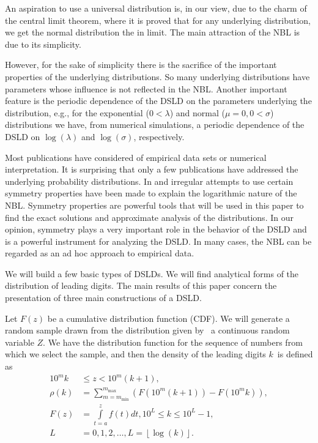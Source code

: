 \documentclass[titlepage,fleqn]{article}%
\begin{document}
An aspiration to use a universal distribution is, in our view, due to the
charm of the central limit theorem, where it is proved that for any underlying
distribution, we get the normal distribution the in limit. The main attraction
of the NBL is due to its simplicity.

However, for the sake of simplicity there is the sacrifice of the important
properties of the underlying distributions. So many underlying distributions
have parameters whose influence is not reflected in the NBL. Another important
feature is the periodic dependence of the DSLD on the parameters underlying
the distribution, e.g., for the exponential ($0<\lambda$) and normal
($\mu=0,0<\sigma$) distributions we have, from numerical simulations, a
periodic dependence of the DSLD on $\log(\lambda)$ and $\log(\sigma)$, respectively.

Most publications have considered of empirical data sets or numerical
interpretation. It is surprising that only a few publications have addressed
the underlying probability distributions. In
\cite{pinkham} and \cite{raimi}
irregular attempts to use certain symmetry properties have been made to
explain the logarithmic nature of the NBL. Symmetry properties are powerful
tools that will be used in this paper to find the exact solutions and
approximate analysis of the distributions. In our opinion, symmetry plays a
very important role in the behavior of the DSLD and is a powerful instrument
for analyzing the DSLD. In many cases, the NBL can be regarded as an ad hoc
approach to empirical data.

We will build a few basic types of DSLDs. We will find analytical forms of the
distribution of leading digits. The main results of this paper concern the
presentation of three main constructions of a DSLD.

Let $F(z)$ be a cumulative distribution function (CDF). We will generate a
random sample drawn from the distribution given by \ a continuous random
variable $Z$. We have the distribution function for the sequence of numbers
from which we select the sample, and then the density of the leading digits
$k$\ is defined as\bigskip%
\begin{align}
10^{m}k  &  \leq z<10^{m}(k+1),\label{MainFormulation}\\
\rho(k)  &  =%
{\displaystyle\sum\limits_{m=m_{\min}}^{m_{\max}}}
\left(  F(10^{m}(k+1))-F(10^{m}k)\right)  ,\\
F(z)  &  =%
{\displaystyle\int\limits_{t=a}^{z}}
f(t)dt,10^{L}\leq k\leq10^{L}-1,\nonumber\\
L  &  =0,1,2,\ldots,L=\left\lfloor \log(k)\right\rfloor .\nonumber
\end{align}
\end{document}
